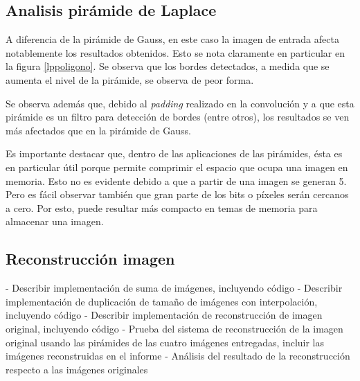 \documentclass[12pt, letterpaper]{article}
\begin{document}
\subsection{Analisis pirámide de Laplace}
A diferencia de la pirámide de Gauss, en este caso la imagen de entrada afecta notablemente los resultados obtenidos. Esto se nota claramente en particular en la figura \ref{lppoligono}. Se observa que los bordes detectados, a medida que se aumenta el nivel de la pirámide, se observa de peor forma. 

\par Se observa además que, debido al \textit{padding} realizado en la convolución y a que esta pirámide es un filtro para detección de bordes (entre otros),  los resultados se ven más afectados que en la pirámide de Gauss. 

\par Es importante destacar que, dentro de las aplicaciones de las pirámides, ésta es en particular útil porque permite comprimir el espacio que ocupa una imagen en memoria. Esto no es evidente debido a que a partir de una imagen se generan 5. Pero es fácil observar también que gran parte de los bits o píxeles serán cercanos a cero. Por esto, puede resultar más compacto en temas de memoria para almacenar una imagen.

\newpage


\subsection{Reconstrucción imagen}
- Describir implementación de suma de imágenes, incluyendo código
- Describir implementación de duplicación de tamaño de imágenes con interpolación, incluyendo
código
- Describir implementación de reconstrucción de imagen original, incluyendo código
- Prueba del sistema de reconstrucción de la imagen original usando las pirámides de las cuatro
imágenes entregadas, incluir las imágenes reconstruidas en el informe
- Análisis del resultado de la reconstrucción respecto a las imágenes originales
\end{document}

